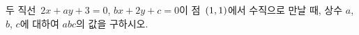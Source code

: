 두 직선~$2x+ay+3=0$, $bx+2y+c=0$이 점~$(1{,}\mkern3mu\mathopen{}1)$에서 수직으로 만날 때, 상수 $a$, $b$, $c$에 대하여 $abc$의 값을 구하시오.
